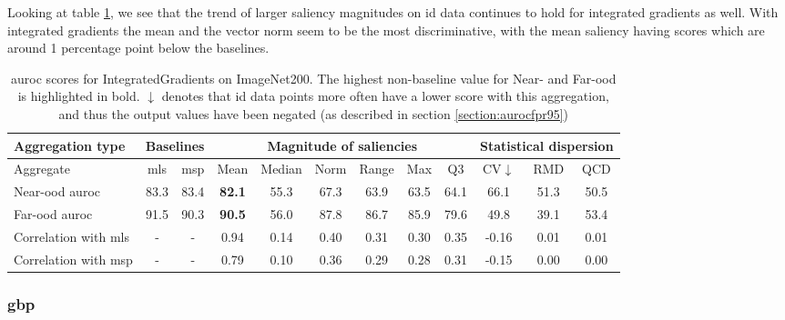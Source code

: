 \documentclass[UKenglish]{uiomasterthesis} %
\theoremstyle{definition}
\begin{document}
Looking at table \ref{table:imagenet200_integratedgradients_metrics}, we see that the trend of larger saliency magnitudes on \ac{id} data continues to hold for integrated gradients as well. With integrated gradients the mean and the vector norm seem to be the most discriminative, with the mean saliency having scores which are around 1 percentage point below the baselines.

\begin{table}[H]
\setlength\tabcolsep{3pt}
\begin{center}
\begin{tabular}{ |p{5.1em}|c c|c c c c c c|c c c| }
    \hline
     \centering Aggregation type & \multicolumn{2}{c|}{Baselines} & \multicolumn{6}{c|}{Magnitude of saliencies} & \multicolumn{3}{p{8em}|}{\centering Statistical dispersion} \\
    \hline
    Aggregate & \ac{mls} & \ac{msp} & Mean & Median & Norm & Range & Max & Q3 & CV$\downarrow$ & RMD & QCD  \\
    \hline
    \rowcolor{near!50}
    Near-\ac{ood} \ac{auroc} & 83.3 & 83.4 &\textbf{ 82.1 }& 55.3 & 67.3 & 63.9 & 63.5 & 64.1 & 66.1 & 51.3 & 50.5  \\
    \hline
    \rowcolor{far!50}
    Far-\ac{ood} \ac{auroc} & 91.5 & 90.3 &\textbf{ 90.5 }& 56.0 & 87.8 & 86.7 & 85.9 & 79.6 & 49.8 & 39.1 & 53.4  \\
    \hline
    Correlation with \ac{mls}& - & - & 0.94 & 0.14 & 0.40 & 0.31 & 0.30 & 0.35 & -0.16 & 0.01 & 0.01  \\
    \hline
    Correlation with \ac{msp}& - & - & 0.79 & 0.10 & 0.36 & 0.29 & 0.28 & 0.31 & -0.15 & 0.00 & 0.00  \\
    \hline
    \end{tabular}
    \caption[\ac{auroc} scores for IntegratedGradients on ImageNet200]{\ac{auroc} scores for IntegratedGradients on ImageNet200. The highest non-baseline value for Near- and Far-\ac{ood} is highlighted in bold. $\downarrow$ denotes that \ac{id} data points more often have a lower score with this aggregation, and thus the output values have been negated (as described in section \ref{section:aurocfpr95})}
    \label{table:imagenet200_integratedgradients_metrics}
\end{center}
\setlength\tabcolsep{6pt}
\end{table}

\subsubsection{\ac*{gbp}}
\end{document}
